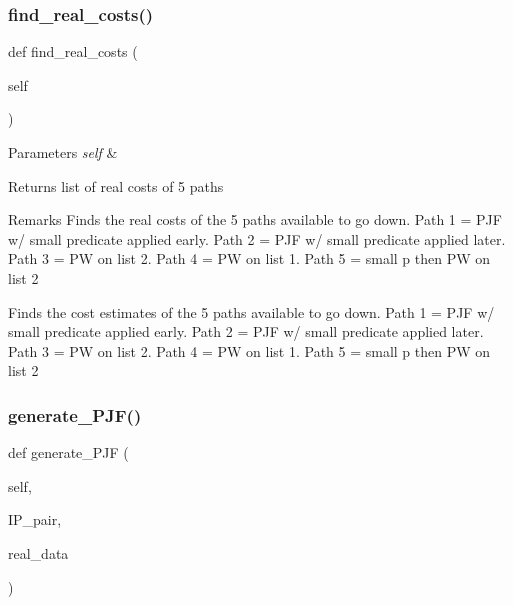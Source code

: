 \subsubsection{\texorpdfstring{find\_real\_costs()}{find\_real\_costs()}}
{\footnotesize\ttfamily def find\+\_\+real\+\_\+costs (\begin{DoxyParamCaption}\item[{}]{self }\end{DoxyParamCaption})}


\begin{DoxyParams}{Parameters}
{\em self} & \\
\hline
\end{DoxyParams}
\begin{DoxyReturn}{Returns}
list of real costs of 5 paths 
\end{DoxyReturn}
\begin{DoxyRemark}{Remarks}
Finds the real costs of the 5 paths available to go down. Path 1 = P\+JF w/ small predicate applied early. Path 2 = P\+JF w/ small predicate applied later. Path 3 = PW on list 2. Path 4 = PW on list 1. Path 5 = small p then PW on list 2\begin{DoxyVerb}Finds the cost estimates of the 5 paths available to go down. Path 1 = PJF w/ small predicate applied early. 
Path 2 = PJF w/ small predicate applied later. Path 3 = PW on list 2. Path 4 = PW on list 1. Path 5 = small p then PW on list 2\end{DoxyVerb}
 
\end{DoxyRemark}
\mbox{\label{classdynamicfilterapp_1_1models_1_1_join_a5392742a9380d1854a4857c33423aaf8}} 
\subsubsection{\texorpdfstring{generate\_PJF()}{generate\_PJF()}}
{\footnotesize\ttfamily def generate\+\_\+\+P\+JF (\begin{DoxyParamCaption}\item[{}]{self,  }\item[{}]{I\+P\+\_\+pair,  }\item[{}]{real\+\_\+data }\end{DoxyParamCaption})}


